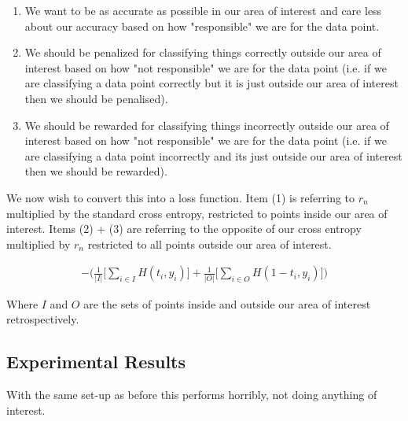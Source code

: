 \documentclass[notitlepage]{report}
\theoremstyle{definition}
\begin{document}
\begin{enumerate}
\item We want to be as accurate as possible in our area of interest and care less about our accuracy based on how "responsible" we are for the data point.
\item We should be penalized for classifying things correctly outside our area of interest based on how "not responsible" we are for the data point (i.e. if we are classifying a data point correctly but it is just outside our area of interest then we should be penalised).
\item We should be rewarded for classifying things incorrectly outside our area of interest based on how "not responsible" we are for the data point (i.e. if we are classifying a data point incorrectly and its just outside our area of interest then we should be rewarded).
\end{enumerate}

We now wish to convert this into a loss function. Item (1) is referring to $r_n$ multiplied by the standard cross entropy, restricted to points inside our area of interest. Items (2) + (3) are referring to the opposite of our cross entropy multiplied by $r_n$ restricted to all points outside our area of interest.

\begin{align}
- \big( \frac{1}{|I|} \big[ \sum_{i \in I} H(t_i, y_i) \big] + \frac{1}{|O|} \big[ \sum_{i \in O} H(1 - t_i, y_i) \big] \big)
\end{align}

Where $I$ and $O$ are the sets of points inside and outside our area of interest retrospectively.

\subsection{Experimental Results}

With the same set-up as before this performs horribly, not doing anything of interest.
\end{document}
